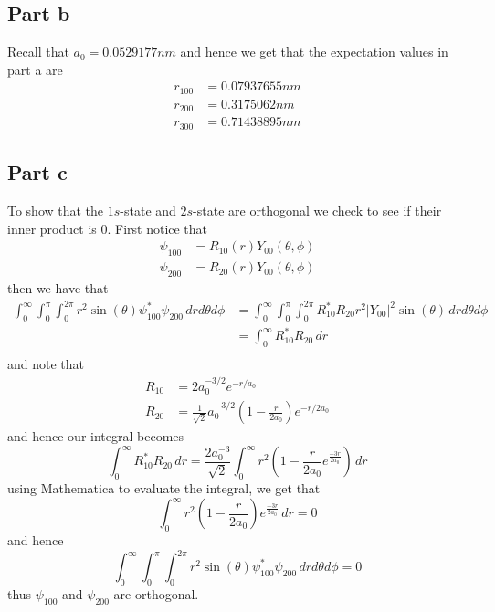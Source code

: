 \documentclass[12pt]{report}
\begin{document}
\subsection*{Part b}
Recall that $a_0 = 0.0529177 \si{nm}$ and hence we get that the expectation values in part a are
\begin{align*}
  r_{100} &= 0.07937655 \si{nm} \\
  r_{200} &= 0.3175062 \si{nm} \\
  r_{300} &= 0.71438895\si{nm}
\end{align*}

\subsection*{Part c}
To show that the $1s$-state and $2s$-state are orthogonal we check to see if their inner product is $0$. First notice that
\begin{align*}
  \psi_{100} &= R_{10}(r)Y_{00}(\theta,\phi) \\
  \psi_{200} &= R_{20}(r)Y_{00}(\theta,\phi)
\end{align*}
then we have that
\begin{align*}
  \int_0^\infty \int_0^\pi \int_0^{2\pi} r^2 \sin(\theta) \psi_{100}^* \psi_{200} \, dr d\theta d\phi &= \int_0^\infty \int_0^\pi \int_0^{2\pi} R_{10}^* R_{20} r^2 |Y_{00}|^2 \sin(\theta) \, dr d\theta d\phi \\  
                                                                                                      &= \int_0^\infty R_{10}^* R_{20} \, dr\\
\end{align*}
and note that
\begin{align*}
  R_{10} &= 2a_0^{-3/2} e^{-r/a_0} \\ 
  R_{20} &= \frac{1}{\sqrt{2}} a_0^{-3/2} \left(1 - \frac{r}{2a_0}\right) e^{-r/2a_0}
\end{align*}
and hence our integral becomes
\begin{equation*}
  \int_0^\infty R_{10}^* R_{20} \, dr = \frac{2a_0^{-3}}{\sqrt{2}}\int_0^\infty r^2\left(1 - \frac{r}{2a_0} e^{\frac{-3r}{2a_0}}\right) \, dr  
\end{equation*}
using Mathematica to evaluate the integral, we get that
\begin{equation*}
  \int_0^\infty r^2\left(1 - \frac{r}{2a_0}\right) e^{\frac{-3r}{2a_0}} \, dr  = 0
\end{equation*}
and hence
\begin{equation*}
  \int_0^\infty \int_0^\pi \int_0^{2\pi} r^2 \sin(\theta) \psi_{100}^* \psi_{200} \, dr d\theta d\phi = 0
\end{equation*}
thus $\psi_{100}$ and $\psi_{200}$ are orthogonal.
\end{document}
